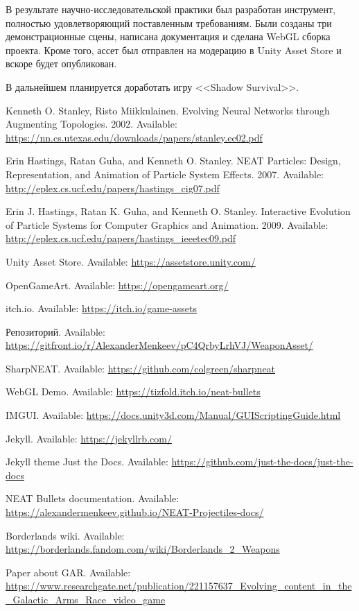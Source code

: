 ﻿

В результате научно-исследовательской практики был разработан инструмент, полностью удовлетворяющий поставленным требованиям. Были созданы три демонстрационные сцены, написана документация и сделана WebGL сборка проекта. Кроме того, ассет был отправлен на модерацию в Unity Asset Store и вскоре будет опубликован.

В дальнейшем планируется доработать игру <<Shadow Survival>>.

\pagebreak

\begin{thebibliography}{1}

     Kenneth O. Stanley, Risto Miikkulainen. \flqq Evolving Neural Networks through Augmenting Topologies\frqq. 2002. Available: \url{https://nn.cs.utexas.edu/downloads/papers/stanley.ec02.pdf}

     Erin Hastings, Ratan Guha, and Kenneth O. Stanley. \flqq NEAT Particles: Design, Representation, and Animation of Particle System Effects\frqq. 2007. Available: \url{http://eplex.cs.ucf.edu/papers/hastings_cig07.pdf}

     Erin J. Hastings, Ratan K. Guha, and Kenneth O. Stanley. \flqq Interactive Evolution of Particle Systems for Computer Graphics and Animation\frqq. 2009. Available: \url{http://eplex.cs.ucf.edu/papers/hastings_ieeetec09.pdf}

     Unity Asset Store. Available: \url{https://assetstore.unity.com/}

     OpenGameArt. Available: \url{https://opengameart.org/}

     itch.io. Available: \url{https://itch.io/game-assets}

     Репозиторий. Available: \url{https://gitfront.io/r/AlexanderMenkeev/pC4QrbyLrhVJ/WeaponAsset/}

     SharpNEAT. Available: \url{https://github.com/colgreen/sharpneat}

     WebGL Demo. Available: \url{https://tizfold.itch.io/neat-bullets}

     IMGUI. Available: \url{https://docs.unity3d.com/Manual/GUIScriptingGuide.html}

     Jekyll. Available: \url{https://jekyllrb.com/}

     Jekyll theme Just the Docs. Available: \url{https://github.com/just-the-docs/just-the-docs}

     NEAT Bullets documentation. Available: \url{https://alexandermenkeev.github.io/NEAT-Projectiles-docs/}

     Borderlands wiki. Available: \url{https://borderlands.fandom.com/wiki/Borderlands_2_Weapons}

     Paper about GAR. Available: \url{https://www.researchgate.net/publication/221157637_Evolving_content_in_the_Galactic_Arms_Race_video_game}

\end{thebibliography}